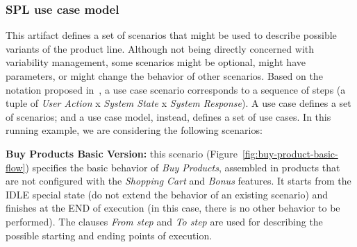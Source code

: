 \documentclass{acm_proc_article-sp}
\begin{document}
\subsubsection{SPL use case model}

This artifact defines a set of scenarios that might be used to describe possible variants of the product line. Although not being directly concerned 
with variability management, some scenarios might be optional, might have parameters, or might change the behavior of other 
scenarios. Based on the notation proposed in~\cite{gcabral-sbmf-2006},  a use case scenario corresponds to a sequence of
steps (a tuple of \emph{User Action} x \emph{System State} x \emph{System Response}).  A use case defines a set of scenarios; and a use case model, instead, defines a set of use cases. In this running example, we are considering the following scenarios:

{\bf Buy Products Basic Version:} this scenario (Figure~\ref{fig:buy-product-basic-flow}) specifies the basic behavior of \emph{Buy Products},
assembled in products that are not configured with the \emph{Shopping Cart} and \emph{Bonus} features. It starts from the IDLE special state 
(do not extend the behavior of an existing scenario) and finishes at the END of execution (in this case, there is no other behavior to be performed).
The clauses \emph{From step} and \emph{To step} are used for describing the possible starting and ending points of execution.
 
\end{document}
